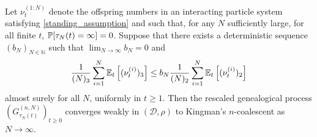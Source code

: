 \begin{theorem}\label{thm:weakconv}
Let $\nu_t^{(1:N)}$ denote the offspring numbers in an interacting particle system satisfying \ref{standing_assumption} and such that, for any $N$ sufficiently large, for all finite $t$, $\mathbb{P}[ \tau_N(t) = \infty ] =0$. Suppose that there exists a deterministic sequence $(b_N)_{N\in\mathbb{N}}$ such that ${\lim}_{N\to\infty} b_N =0$ and%
\begin{equation}\label{eq:mainthmcondition2}
\frac{1}{(N)_3} \sum_{i = 1}^N \mathbb{E}_t\left[ (\nu_t^{(i)})_3 \right]  \leq b_N \frac{1}{(N)_2} \sum_{i = 1}^N \mathbb{E}_t\left[ (\nu_t^{(i)})_2 \right]
\end{equation}
almost surely for all $N$, uniformly in $t \geq 1$.
Then the rescaled genealogical process $(G_{\tau_N(t)}^{(n,N)})_{t\geq0}$ converges weakly in $(\mathcal{D}, \rho)$
to Kingman's $n$-coalescent as $N \to \infty$.
\end{theorem}

